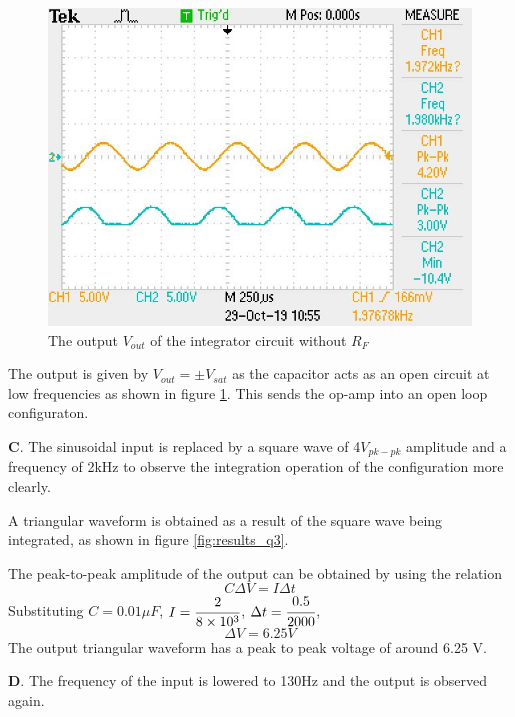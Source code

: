 \documentclass[12pt, titlepage]{article}
\theoremstyle{definition}
\begin{document}
    \begin{figure}[h]
      \centering
      \includegraphics[scale=0.5]{images/results_q2.jpeg}
      \caption{The output \color{cyan}$V_{out}$ \color{black}of the integrator circuit without $R_F$}
      \label{fig:results_q2}
    \end{figure}

    The output is given by $V_{out}=\pm V_{sat}$ as the capacitor acts as an open circuit at low frequencies as shown in figure \ref{fig:results_q2}. This sends the op-amp into an open loop configuraton.

    \textbf{C}. The sinusoidal input is replaced by a square wave of 4$V_{pk-pk}$ amplitude and a frequency of 2kHz to observe the integration operation of the configuration more clearly.

    A triangular waveform is obtained as a result of the square wave being integrated, as shown in figure \ref{fig:results_q3}.

    The peak-to-peak amplitude of the output can be obtained by using the relation
    $$ C\Delta V = I\Delta t$$
    Substituting $C=0.01\mu F$, $I=\cfrac{2}{8\times 10^3}$, $\Delta t = \cfrac{0.5}{2000}$,
    $$ \Delta V = 6.25 V$$
    The output triangular waveform has a peak to peak voltage of around 6.25 V.

    \textbf{D}. The frequency of the input is lowered to 130Hz and the output is observed again.
\end{document}
